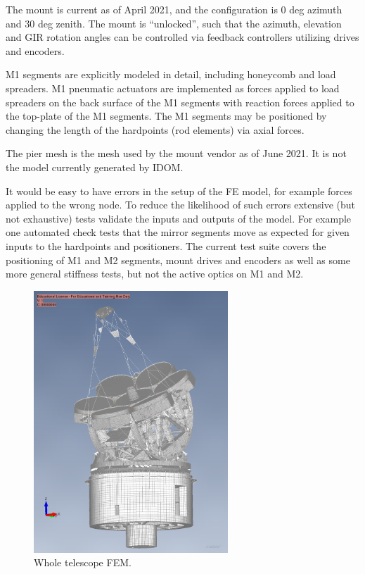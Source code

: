 The mount is current as of April 2021, and the configuration is 0 deg azimuth and 30 deg zenith. 
The mount is ``unlocked'', such that the  azimuth, elevation and GIR rotation angles can be controlled via feedback controllers utilizing drives and encoders.
 
M1 segments are explicitly modeled in detail, including honeycomb and load spreaders. 
M1 pneumatic actuators are implemented as forces applied to load spreaders on the back surface of the M1 segments with reaction forces applied to the top-plate of the M1 segments. 
The M1 segments may be positioned by changing the length of the hardpoints (rod elements) via axial forces.

The pier mesh is the mesh used by the mount vendor as of June 2021. It is not the model currently generated by IDOM.

It would be easy to have errors in the setup of the FE model, for example forces applied to the wrong node. 
To reduce the likelihood of such errors extensive (but not exhaustive) tests validate the inputs and outputs of the model. 
For example one automated check tests that the mirror segments move as expected for given inputs to the hardpoints and positioners.
The current test suite covers the positioning of M1 and M2 segments, mount
drives and encoders as well as some more general stiffness tests, but not the
active optics on M1 and M2.

\begin{figure}
  \centering
  \includegraphics[width=0.65\textwidth]{FEM/whole_telescope.png}
  \caption{Whole telescope FEM.}
  \label{fig:fem-whole}
\end{figure}


